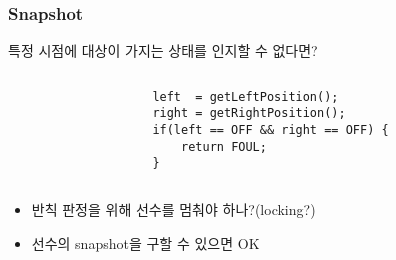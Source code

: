 \begin{frame}[fragile]
\frametitle{Snapshot}

특정 시점에 대상이 가지는 상태를 인지할 수 없다면?

\begin{columns}[t]
  \begin{column}{.5\textwidth}
\\
  \end{column}
  \begin{column}{.5\textwidth}
  \lstset{language=Java,basicstyle=\ttfamily\small}
  \begin{lstlisting}
left  = getLeftPosition();
right = getRightPosition();
if(left == OFF && right == OFF) {
    return FOUL;
}
  \end{lstlisting}
  \end{column}
\end{columns}

\begin{itemize}
\item 반칙 판정을 위해 선수를 멈춰야 하나?(locking?)
\item 선수의 snapshot을 구할 수 있으면 OK
\end{itemize}

\end{frame}


